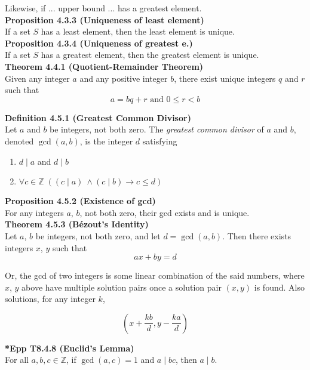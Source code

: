 \documentclass[a4paper]{article}
\newcommand{\subheading}[1]{{\scriptsize\textbf{#1}}}
\newcommand\divides{\;|\;}
\begin{document}
\begin{multicols*}{4}
Likewise, if ... upper bound ... has a greatest element.\\

\subheading{Proposition 4.3.3 (Uniqueness of least element)}\\
If a set $S$ has a least element, then the least element is unique.\\

\subheading{Proposition 4.3.4 (Uniqueness of greatest e.)}\\
If a set $S$ has a greatest element, then the greatest element is unique.\\

\subheading{Theorem 4.4.1 (Quotient-Remainder Theorem)}\\
Given any integer $a$ and any positive integer $b$, there exist unique integers
$q$ and $r$ such that $$ a = bq + r \text{ and } 0 \leq r < b$$

\subheading{Definition 4.5.1 (Greatest Common Divisor)}\\
Let $a$ and $b$ be integers, not both zero. The \textit{greatest common divisor}
of $a$ and $b$, denoted $\gcd(a, b)$, is the integer $d$ satisfying

\begin{enumerate} \itemsep -0.5em
  \item $d \divides a$ and $d \divides b$
  \item $\forall c \in \mathbb{Z}\;((c \divides a)\ \land (c \divides b)
    \rightarrow c \leq d)$
\end{enumerate}

\subheading{Proposition 4.5.2 (Existence of gcd)}\\
For any integers $a$, $b$, not both zero, their gcd exists and is unique.\\

\subheading{Theorem 4.5.3 (B\'ezout's Identity)}\\
Let $a$, $b$ be integers, not both zero, and let $d = \gcd(a, b)$. Then
there exists integers $x$, $y$ such that $$ax + by = d$$

Or, the gcd of two integers is some linear combination of the said numbers,
where $x$, $y$ above have multiple solution pairs once a solution pair $(x, y)$
is found. Also solutions, for any integer $k$,

$$ (x+\frac{kb}{d}, y-\frac{ka}{d}) $$

\subheading{*Epp T8.4.8 (Euclid's Lemma)}\\
For all $a, b, c \in \mathbb{Z}$, if $\gcd(a, c) = 1$ and $a \divides bc$,
then $a \divides b$.\\


\end{multicols*}
\end{document}
